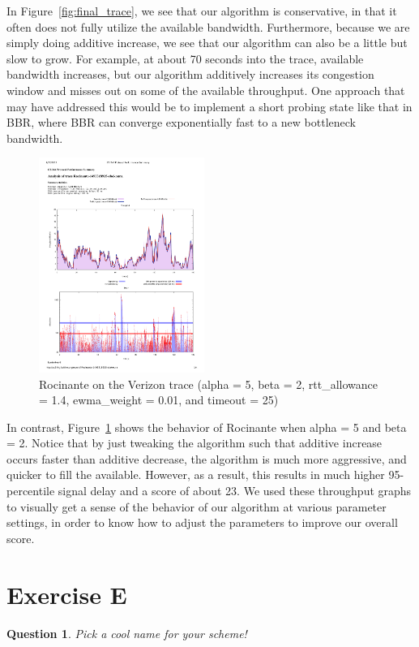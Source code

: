 \documentclass[twoside]{article}
\newtheorem{question}[theorem]{Question}
\newcounter{example}[section]
\begin{document}
In Figure~\ref{fig:final_trace}, we see that our algorithm is conservative, in
that it often does not fully utilize the available bandwidth. Furthermore,
because we are simply doing additive increase, we see that our algorithm can
also be a little but slow to grow. For example, at about 70 seconds into the
trace, available bandwidth increases, but our algorithm additively increases
its congestion window and misses out on some of the available throughput.
One approach that may have addressed this would be to implement a short probing
state like that in BBR, where BBR can converge exponentially fast to a new
bottleneck bandwidth.

\begin{figure}[h]
  \centering
  \includegraphics[height=7cm, clip, trim={1cm 12cm 1cm 6cm}]{./img/a5b2.pdf}
  \caption{Rocinante on the Verizon trace (alpha = 5, beta = 2,
    rtt\_allowance = 1.4, ewma\_weight = 0.01, and timeout = 25)
  }
  \label{fig:a5b2}
\end{figure}

In contrast, Figure~\ref{fig:a5b2} shows the behavior of Rocinante when
alpha = 5 and beta = 2. Notice that by just tweaking the algorithm such that
additive increase occurs faster than additive decrease, the algorithm is much
more aggressive, and quicker to fill the available. However, as a result, this
results in much higher 95-percentile signal delay and a score of about 23.
We used these throughput graphs to visually get a sense of the behavior of
our algorithm at various parameter settings, in order to know how to adjust
the parameters to improve our overall score.

\vfill
\pagebreak

\section*{Exercise E}
\begin{question}
  Pick a cool name for your scheme!
\end{question}
\end{document}
